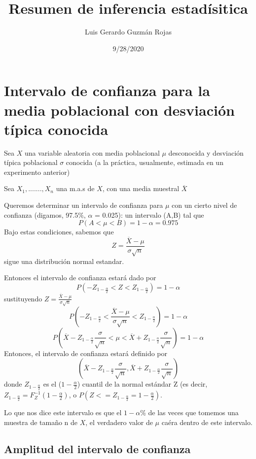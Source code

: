 \documentclass[
]{article}
\title{Resumen de inferencia estadísitica}
\author{Luis Gerardo Guzmán Rojas}
\date{9/28/2020}
\begin{document}
\maketitle

\hypertarget{intervalo-de-confianza-para-la-media-poblacional-con-desviaciuxf3n-tuxedpica-conocida}{%
\section{Intervalo de confianza para la media poblacional con desviación
típica
conocida}\label{intervalo-de-confianza-para-la-media-poblacional-con-desviaciuxf3n-tuxedpica-conocida}}

Sea \(X\) una variable aleatoria con media poblacional \(\mu\)
desconocida y desviación típica poblacional \(\sigma\) conocida (a la
práctica, usualmente, estimada en un experimento anterior)

Sea \(X_1,.......,X_n\) una m.a.s de \(X\), con una media muestral
\(\overline{X}\)

Queremos determinar un intervalo de confianza para \(\mu\) con un cierto
nivel de confianza (digamos, 97.5\%, \(\alpha\) = 0.025): un intervalo
(A,B) tal que \[P(A < \mu < B) = 1 - \alpha = 0.975\] Bajo estas
condiciones, sabemos que
\[Z = \frac{\overline{X}-\mu} {\sigma \sqrt{n}}\] sigue una distribución
normal estandar.

Entonces el intervalo de confianza estará dado por
\[P(-Z_{1-\frac{\alpha}{2}} < Z < Z_{1-\frac{\alpha}{2}}) = 1 - \alpha\]
sustituyendo \(Z = \frac{\overline{X}-\mu} {\sigma \sqrt{n}}\)
\[P(-Z_{1-\frac{\alpha}{2}} < \frac{\overline{X}-\mu} {\sigma \sqrt{n}} < Z_{1-\frac{\alpha}{2}}) = 1 - \alpha\]
\[P(\overline{X}-Z_{1-\frac{\alpha}{2}}\frac{\sigma}{\sqrt{n}} < \mu < \overline{X}+Z_{1-\frac{\alpha}{2}}\frac{\sigma}{\sqrt{n}}) = 1 - \alpha\]
Entonces, el intervalo de confianza estará definido por
\[(\overline{X}-Z_{1-\frac{\alpha}{2}}\frac{\sigma}{\sqrt{n}}, \overline{X}+Z_{1-\frac{\alpha}{2}}\frac{\sigma}{\sqrt{n}})\]
donde \(Z_{1 - \frac{\alpha}{2}}\) es el (\(1 - \frac{\alpha}{2}\))
cuantil de la normal estándar Z (es decir,
\(Z_{1-\frac{\alpha}{2}} = F^{-1}_Z(1-\frac{\alpha}{2})\), o
\(P(Z <= Z_{1-\frac{\alpha}{2}} = 1-\frac{\alpha}{2})\).

Lo que nos dice este intervalo es que el \(1 - \alpha\)\% de las veces
que tomemos una muestra de tamaño n de \(X\), el verdadero valor de
\(\mu\) caéra dentro de este intervalo.

\hypertarget{amplitud-del-intervalo-de-confianza}{%
\subsection{Amplitud del intervalo de
confianza}\label{amplitud-del-intervalo-de-confianza}}
\end{document}
